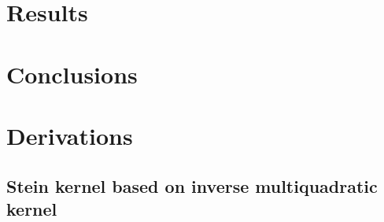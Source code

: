 \documentclass[12pt,a4paper]{report}
\begin{document}
\chapter{Results}

\chapter{Conclusions}

\appendix
\chapter{Derivations}
\label{appendix:derivations}

\section{Stein kernel based on inverse multiquadratic kernel}
\label{appendix:derivations:imq-stein}
\end{document}
